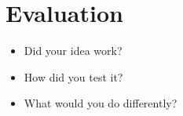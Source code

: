 \section{Evaluation}

\begin{itemize}
    \item Did your idea work?
    \item How did you test it?
    \item What would you do differently?
\end{itemize}
